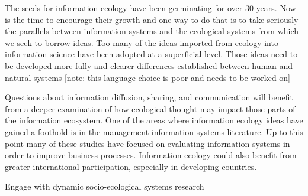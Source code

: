 The seeds for information ecology have been germinating for over 30 years. Now is the time to encourage their growth and one way to do that is to take seriously the parallels between information systems and the ecological systems from which we seek to borrow ideas. Too many of the ideas imported from ecology into information science have been adopted at a superficial level. Those ideas need to be developed more fully and clearer differences established between human and natural systems [note: this language choice is poor and needs to be worked on]

Questions about information diffusion, sharing, and communication will benefit from a deeper examination of how ecological thought may impact those parts of the information ecosystem. One of the areas where information ecology ideas have gained a foothold is in the management information systems literature. Up to this point many of these studies have focused on evaluating information systems in order to improve business processes. Information ecology could also benefit from greater international participation, especially in developing countries. \cite{wang_information_2015}

Engage with dynamic socio-ecological systems research \cite{liu_etal_2007}